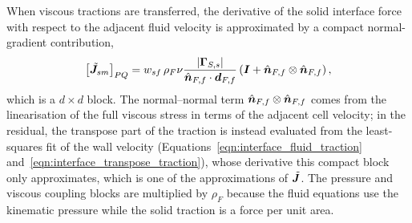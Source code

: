 When viscous tractions are transferred, the derivative of the solid interface
force with respect to the adjacent fluid velocity is approximated by a compact
normal-gradient contribution,
\begin{equation}
    \left[\tilde{\boldsymbol{J}}_{sm}\right]_{P Q}
    =
    w_{sf}\,
    \rho_F \nu
    \frac{|\boldsymbol{\Gamma}_{S,s}|}
         {\hat{\boldsymbol{n}}_{F,f} \cdot \boldsymbol{d}_{F,f}}
    \left(
    \boldsymbol{I}
    +
    \hat{\boldsymbol{n}}_{F,f} \otimes \hat{\boldsymbol{n}}_{F,f}
    \right),
    \label{eqn:viscous_coupling_approximation}
\end{equation}
which is a $d\times d$ block.
The normal--normal term $\hat{\boldsymbol{n}}_{F,f} \otimes \hat{\boldsymbol{n}}_{F,f}$ comes from the linearisation of the full viscous stress in terms of the adjacent cell velocity; in the residual, the transpose part of the traction is instead evaluated from the least-squares fit of the wall velocity (Equations~\eqref{eqn:interface_fluid_traction} and~\eqref{eqn:interface_transpose_traction}), whose derivative this compact block only approximates, which is one of the approximations of $\tilde{\boldsymbol{J}}$.
The pressure and viscous coupling blocks are multiplied by $\rho_F$ because the fluid equations use the kinematic pressure while the solid traction is a force per unit area.
